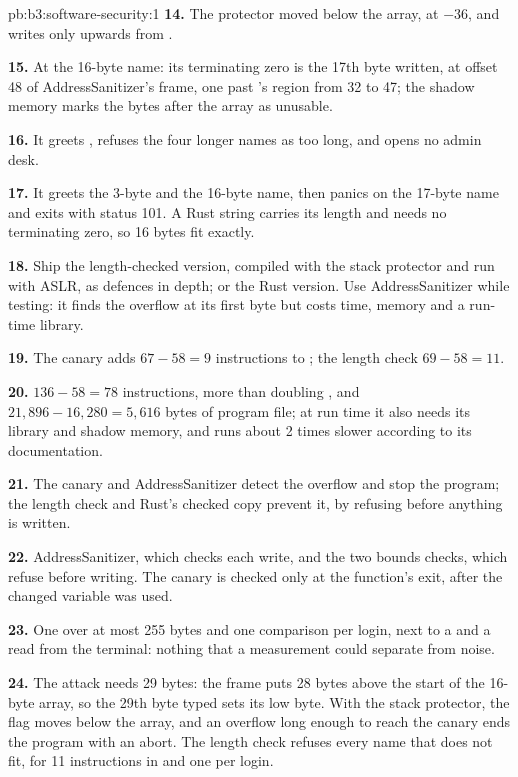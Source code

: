 \begin{solution}{pb:b3:software-security:1}
\textbf{14.} The protector moved  below the array, at $-36$, and  writes only upwards from .

\textbf{15.} At the 16-byte name: its terminating zero is the 17th byte written, at offset 48 of AddressSanitizer's frame, one past 's region from 32 to 47; the shadow memory marks the bytes after the array as unusable.

\textbf{16.} It greets , refuses the four longer names as too long, and opens no admin desk.

\textbf{17.} It greets the 3-byte and the 16-byte name, then panics on the 17-byte name and exits with status 101. A Rust string carries its length and needs no terminating zero, so 16 bytes fit exactly.

\textbf{18.} Ship the length-checked version, compiled with the stack protector and run with ASLR, as defences in depth; or the Rust version. Use AddressSanitizer while testing: it finds the overflow at its first byte but costs time, memory and a run-time library.

\textbf{19.} The canary adds $67 - 58 = 9$ instructions to ; the length check $69 - 58 = 11$.

\textbf{20.} $136 - 58 = 78$ instructions, more than doubling , and $21{,}896 - 16{,}280 = 5{,}616$ bytes of program file; at run time it also needs its library and shadow memory, and runs about 2 times slower according to its documentation.

\textbf{21.} The canary and AddressSanitizer detect the overflow and stop the program; the length check and Rust's checked copy prevent it, by refusing before anything is written.

\textbf{22.} AddressSanitizer, which checks each write, and the two bounds checks, which refuse before writing. The canary is checked only at the function's exit, after the changed variable was used.

\textbf{23.} One  over at most 255 bytes and one comparison per login, next to a  and a read from the terminal: nothing that a measurement could separate from noise.

\textbf{24.} The attack needs 29 bytes: the frame puts  28 bytes above the start of the 16-byte array, so the 29th byte typed sets its low byte. With the stack protector, the flag moves below the array, and an overflow long enough to reach the canary ends the program with an abort. The length check refuses every name that does not fit, for 11 instructions in  and one  per login.
\end{solution}
